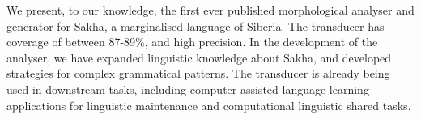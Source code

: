 We present, to our knowledge, the first ever published morphological analyser and generator for Sakha, a marginalised language of Siberia. The transducer has coverage of between 87-89\%, and high precision. In the development of the analyser, we have expanded linguistic knowledge about Sakha, and developed strategies for complex grammatical patterns. The transducer is already being used in downstream tasks, including computer assisted language learning applications for linguistic maintenance and computational linguistic shared tasks.

